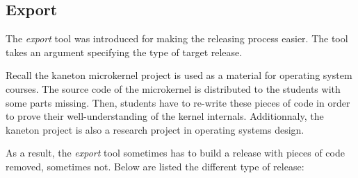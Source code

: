 %
%
%
%
%
%

%
%

\subsection{Export}
\label{section:export}

The \textit{export} tool was introduced for making the releasing process
easier. The tool takes an argument specifying the type of target release.

Recall the kaneton microkernel project is used as a material for operating
system courses. The source code of the microkernel is distributed to
the students with some parts missing. Then, students have to re-write
these pieces of code in order to prove their well-understanding of the
kernel internals. Additionnaly, the kaneton project is also a research project
in operating systems design.

As a result, the \textit{export} tool sometimes has to build a release
with pieces of code removed, sometimes not. Below are listed the different
type of release:

